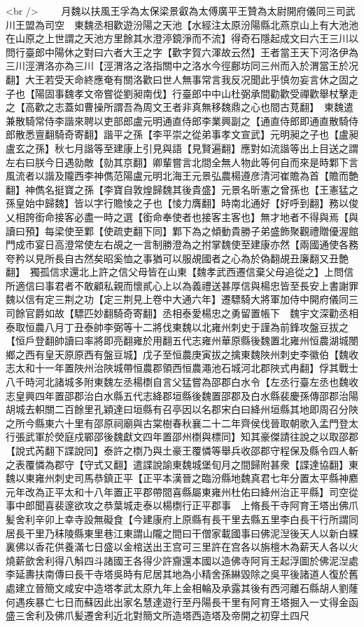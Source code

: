 <br />
　　月魏以扶風王孚為太保梁景叡為太傅廣平王贊為太尉開府儀同三司武川王盟為司空　東魏丞相歡遊汾陽之天池【水經注太原汾陽縣北燕京山上有大池池在山原之上世謂之天池方里餘其水澄渟鏡淨而不流】得奇石隱起成文曰六王三川以問行臺郎中陽休之對曰六者大王之字【歡字賀六渾故云然】王者當王天下河洛伊為三川涇渭洛亦為三川【涇渭洛之洛指關中之洛水今徑鄜坊同三州而入於渭當王於况翻】大王若受天命終應奄有關洛歡曰世人無事常言我反况聞此乎慎勿妄言休之固之子也【陽固事魏孝文帝嘗從劉昶南伐】行臺郎中中山杜弼承間勸歡受禪歡舉杖擊走之【高歡之志蓋如曹操所謂吾為周文王者非真無移魏鼎之心也間古莧翻】　東魏遣兼散騎常侍李諧來聘以吏部郎盧元明通直侍郎李業興副之【通直侍郎即通直散騎侍郎散悉亶翻騎奇寄翻】諧平之孫【李平崇之從弟事孝文宣武】元明昶之子也【盧昶盧玄之孫】秋七月諧等至建康上引見與語【見賢遍翻】應對如流諧等出上目送之謂左右曰朕今日遇勍敵【勍其京翻】卿輩嘗言北間全無人物此等何自而來是時鄴下言風流者以諧及隴西李神儁范陽盧元明北海王元景弘農楊遵彦清河崔贍為首【贍而艶翻】神儁名挺寶之孫【李寶自敦煌歸魏其後貴盛】元景名昕憲之曾孫也【王憲猛之孫皇始中歸魏】皆以字行贍㥄之子也【㥄力膺翻】時南北通好【好呼到翻】務以俊乂相誇銜命接客必盡一時之選【銜命奉使者也接客主客也】無才地者不得與焉【與讀曰預】每梁使至鄴【使疏吏翻下同】鄴下為之傾動貴勝子弟盛飾聚觀禮贈優渥館門成市宴日高澄常使左右覘之一言制勝澄為之拊掌魏使至建康亦然【兩國通使各務夸矜以見所長自古然矣昭奚恤之事猶可以服覘國者之心為於偽翻覘丑廉翻又丑艶翻】　獨孤信求還北上許之信父母皆在山東【魏孝武西遷信棄父母追從之】上問信所適信曰事君者不敢顧私親而懷貳心上以為義禮送甚厚信與楊忠皆至長安上書謝罪魏以信有定三荆之功【定三荆見上卷中大通六年】遷驃騎大將軍加侍中開府儀同三司餘官爵如故【驃匹妙翻騎奇寄翻】丞相泰愛楊忠之勇留置帳下　魏宇文深勸丞相泰取恒農八月丁丑泰帥李弼等十二將伐東魏以北雍州刺史于謹為前鋒攻盤豆拔之【恒戶登翻帥讀曰率將即亮翻雍於用翻五代志雍州華原縣後魏置北雍州恒農湖城閿鄉之西有皇天原原西有盤豆城】戊子至恒農庚寅拔之擒東魏陜州刺史李徽伯【魏收志太和十一年置陜州治陜城帶恒農郡領西恒農澠池石城河北郡陜式冉翻】俘其戰士八千時河北諸城多附東魏左丞楊檦自言父猛嘗為邵郡白水令【左丞行臺左丞也魏收志皇興四年置邵郡治白水縣五代志絳郡垣縣後魏置邵郡及白水縣裴慶孫傳邵郡治陽胡城去軹關二百餘里孔穎達曰垣縣有召亭因以名郡宋白曰絳州垣縣其地即周召分陜之所今縣東六十里有邵原祠廟與古棠樹春秋襄二十二年齊侯伐晉取朝歌入孟門登太行張武軍於熒庭戍鄲邵後魏獻文四年置邵州檦與標同】知其豪傑請往說之以取邵郡【說式芮翻下諜說同】泰許之檦乃與土豪王覆憐等舉兵收邵郡守程保及縣令四人斬之表覆憐為郡守【守式又翻】遣諜說諭東魏城堡旬月之間歸附甚衆【諜達協翻】東魏以東雍州刺史司馬恭鎮正平【正平本漢晉之臨汾縣地魏真君七年分置太平縣神䴥元年改為正平太和十八年置正平郡帶間喜縣屬東雍州杜佑曰絳州治正平縣】司空從事中郎聞喜裴邃欲攻之恭葉城走泰以楊檦行正平郡事　上脩長干寺阿育王塔出佛爪髪舍利辛卯上幸寺設無礙食【今建康府上原縣有長干里去縣五里李白長干行所謂同居長干里乃秣陵縣東里巷江東謂山隴之間曰干僧家載國事曰佛泥湼後天人以新白緤裏佛以香花供養滿七日盛以金棺送出王宫可三里許在宫各以旃檀木為薪天人各以火燒薪歛舍利得八斛四斗諸國王各得少許齎還本國以造佛寺阿肓王起浮圖於佛泥湼處李延夀扶南傳曰長干寺塔吳時有尼居其地為小精舍孫綝毀除之吳平後諸道人復於舊處建立晉簡文咸安中造塔孝武太原九年上金相輪及承露其後有西河離石縣胡人劉蕯何遇疾暴亡七日而蘇因此出家名慧達遊行至丹陽長干里有阿育王塔掘入一丈得金函盛三舍利及佛爪髪遷舍利近北對簡文所造塔西造塔及帝開之初穿土四尺